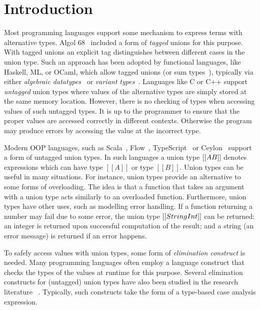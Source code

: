 \section{Introduction}
\label{sec:intro}

Most programming languages support some mechanism to express terms
with alternative types. Algol 68~\cite{van1969report,van2012revised} included a form of
\emph{tagged} unions for this purpose. With tagged unions
an explicit tag distinguishes between different cases in the
union type.
Such an approach has been adopted by functional languages, like Haskell, ML, or
OCaml, which allow tagged unions (or sum types~\cite{pierce2002types}), typically via
either \emph{algebraic datatypes}~\cite{hope} or \emph{variant types}~\cite{garrigue98}.
Languages like C or C++ support \emph{untagged} union types where
values of the alternative types are simply stored at the same memory
location. However, there is no checking of types when accessing values of
such untagged types. It is up to the programmer to ensure that the proper
values are accessed correctly in different contexts. Otherwise the
program may produce errors by accessing the value at the incorrect type.

Modern OOP languages, such as Scala~\cite{scala3doc}, Flow~\cite{chaudhuri2015flow},
TypeScript~\cite{bierman2014understanding} or Ceylon~\cite{king2013ceylon} support a form
of untagged union types.
In such languages a union type $[[A \/ B]]$ denotes expressions which can have type
$[[A]]$ or type $[[B]]$. Union types can be useful in many situations.
For instance, union types provide an alternative to some forms
of overloading. The idea is that a function that takes an argument
with a union type acts similarly to an overloaded function.
Furthermore, union types have other uses, such as modelling error handling.
If a function returning a number may fail due to some
error, the union type $[[String \/ Int]]$ can be returned: an integer
is returned upon successful computation of the result; and
a string (an error message) is returned if an error happens.

To safely access values with union types, some form of
\emph{elimination construct} is needed. Many programming languages often
employ a language construct that checks
the types of the values at runtime for this purpose.
Several elimination constructs for (untagged) union types
have also been studied in the research literature~
\cite{benzaken2003cduce,dunfield2014elaborating,castagna:settheoretic}.
Typically, such constructs take the form of a type-based case analysis
expression.

